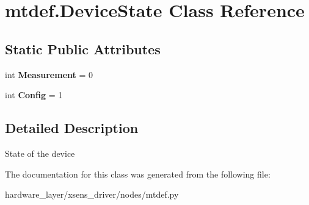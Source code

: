 \hypertarget{classmtdef_1_1DeviceState}{}\section{mtdef.\+Device\+State Class Reference}
\label{classmtdef_1_1DeviceState}
\subsection*{Static Public Attributes}
\begin{DoxyCompactItemize}
\item 
\mbox{\label{classmtdef_1_1DeviceState_a705b5ce4d7597d7a08be708c11003fc9}} 
int {\bfseries Measurement} = 0
\item 
\mbox{\label{classmtdef_1_1DeviceState_acf273cb71dcc1630fcce97d4f8850509}} 
int {\bfseries Config} = 1
\end{DoxyCompactItemize}


\subsection{Detailed Description}
\begin{DoxyVerb}State of the device\end{DoxyVerb}
 

The documentation for this class was generated from the following file\+:\begin{DoxyCompactItemize}
\item 
hardware\+\_\+layer/xsens\+\_\+driver/nodes/mtdef.\+py\end{DoxyCompactItemize}
